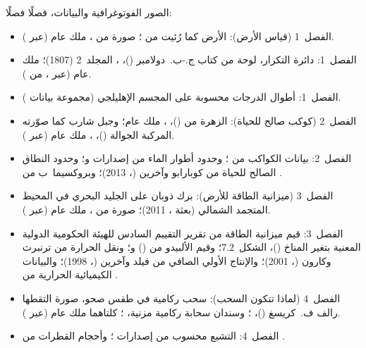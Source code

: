 \bigskip
\noindent الصور الفوتوغرافية والبيانات، فصلًا فصلًا:
\begin{itemize}\small
  \item الفصل~1 (قياس الأرض): الأرض كما رُئيت من ؛ صورة من ، ملك عام (عبر ).
  \item الفصل~1: دائرة التكرار، لوحة من كتاب ج.-ب.~دولامبر ()، ، المجلد~2 (1807)؛ ملك عام (عبر ، من ).
  \item الفصل~1: أطوال الدرجات محسوبة على المجسم الإهليلجي  (مجموعة بيانات ).
  \item الفصل~2 (كوكب صالح للحياة): الزهرة من  ()، ، ملك عام؛ وجبل شارب كما صوّرته المركبة الجوالة  ()، ، ملك عام (عبر ).
  \item الفصل~2: بيانات الكواكب من ؛ وحدود أطوار الماء من إصدارات   و؛ وحدود النطاق الصالح للحياة من كوبارابو وآخرين (، 2013)؛ وبروكسيما~ب من .
  \item الفصل~3 (ميزانية الطاقة للأرض): برك ذوبان على الجليد البحري في المحيط المتجمد الشمالي (بعثة ، 2011)؛ صورة من ، ملك عام (عبر ).
  \item الفصل~3: قيم ميزانية الطاقة من تقرير التقييم السادس للهيئة الحكومية الدولية المعنية بتغير المناخ ()، الشكل~7.2؛ وقيم الألبيدو من  () و؛ ونقل الحرارة من ترنبرث وكارون (، 2001)؛ والإنتاج الأولي الصافي من فيلد وآخرين (، 1998)؛ والبيانات الكيميائية الحرارية من .
  \item الفصل~4 (لماذا تتكون السحب): سحب ركامية في طقس صحو، صورة التقطها رالف ف.~كريسغ ()، ؛ وسندان سحابة ركامية مزنية، ؛ كلتاهما ملك عام (عبر ).
  \item الفصل~4: التشبع محسوب من إصدارات ؛ وأحجام القطرات من .

\end{itemize}

